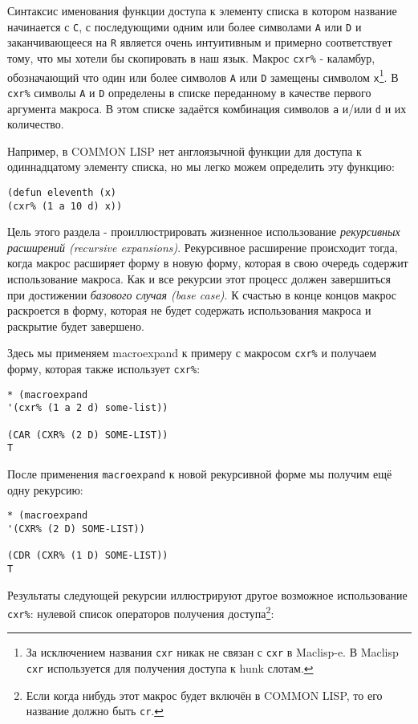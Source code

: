 Синтаксис именования функции доступа к элементу списка в котором название начинается с \verb"C", с последующими одним или более символами \verb"A" или \verb"D" и заканчивающееся на \verb"R" является очень интуитивным и примерно соответствует тому, что мы хотели бы скопировать в наш язык. Макрос \verb"cxr%" - каламбур, обозначающий что один или более символов \verb"A" или \verb"D" замещены символом \verb"x"\footnote{За исключением названия \verb"cxr" никак не связан с \verb"cxr" в Maclisp-e. В Maclisp \verb"cxr" используется для получения доступа к hunk слотам.}. В \verb"cxr%" символы \verb"A" и \verb"D" определены в списке переданному в качестве первого аргумента макроса. В этом списке задаётся комбинация символов \verb"a" и/или \verb"d" и их количество.



Например, в COMMON LISP нет англоязычной функции для доступа к одиннадцатому элементу списка, но мы легко можем определить эту функцию:

\begin{verbatim}
(defun eleventh (x)
(cxr% (1 a 10 d) x))
\end{verbatim}

Цель этого раздела - проиллюстрировать жизненное использование \emph{рекурсивных расширений (recursive expansions)}. Рекурсивное расширение происходит тогда, когда макрос расширяет форму в новую форму, которая в свою очередь содержит использование макроса. Как и все рекурсии этот процесс должен завершиться при достижении \emph{базового случая (base case)}. К счастью в конце концов макрос раскроется в форму, которая не будет содержать использования макроса и раскрытие будет завершено.

Здесь мы применяем macroexpand к примеру с макросом \verb"cxr%" и получаем форму, которая также использует \verb"cxr%":

\begin{verbatim}
* (macroexpand
'(cxr% (1 a 2 d) some-list))

(CAR (CXR% (2 D) SOME-LIST))
T
\end{verbatim}

После применения \verb"macroexpand" к новой рекурсивной форме мы получим ещё одну рекурсию:

\begin{verbatim}
* (macroexpand
'(CXR% (2 D) SOME-LIST))

(CDR (CXR% (1 D) SOME-LIST))
T
\end{verbatim}

Результаты следующей рекурсии иллюстрируют другое возможное использование \verb"cxr%": нулевой список операторов получения доступа\footnote{Если когда нибудь этот макрос будет включён в COMMON LISP, то его название должно быть \verb"cr".}:



